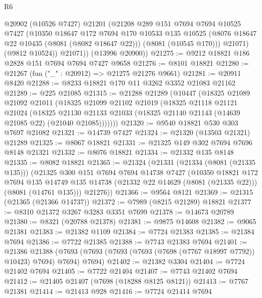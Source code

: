 \begin{lexlean}{R6}
\begin{coremodule}
            @20902
            (@10526 @7427)
            @21201
            (@21208
              @289
              @151
              @7694
              @7694
              @10525
              @7427
              (@10350
                @18647
                @172
                @7694
                @170
                @10533
                @135
                @10525
                (@8076 @18647 @22 @10435 (@8081 (@8082 @18647 @22)))
                (@8081 (@10545 @170)))
              @21071)
            (@9812 @10524))
          @21071))
      (@13996 @20900))
@21275 := @9212 @18821 @186 @2828 @151 @7694 @7694 @7427 @9658
@21276 := @8101 @18821
@21280 := @21267 (fun ("_" : @20912) => @21275 @21276 @9661)
@21281 := @20911 @8420
@21288 := @8233 @18821 @170 @11 @3262 @3352 @21083 @21162
@21289 := @225 @21085
@21315 := @21288
    @21289
    (@10447
      (@18325
        @21089
        @21092
        @21011
        (@18325
          @21099
          @21102
          @21019
          (@18325
            @21118
            @21121
            @21024
            (@18325
              @21130
              @21133
              @21033
              (@18325 @21140 @21143 (@14639 @21085 @22) (@21040 @21085)))))))
@21320 := @9540 @18821 @530 @303 @7697 @21082
@21321 := @14739 @7427
@21324 := @21320 (@13503 @21321) @21289
@21325 := @8067 @18821
@21331 := @21325 @149 @302 @7694 @7696 @8148 @21321
@21332 := @8076 @18821
@21334 := @21332 @135 @8148
@21335 := @8082 @18821
@21365 := @21324
    (@21331
      (@21334 (@8081 (@21335 @135)))
      (@21325
        @300
        @151
        @7694
        @7694
        @14738
        @7427
        (@10350
          @18821
          @172
          @7694
          @135
          @14749
          @135
          @14738
          (@21332 @22 @14629 (@8081 (@21335 @22)))
          (@8081 (@14761 @135)))
        @21276))
@21366 := @9564 @8121
@21369 := @21315 (@21365 (@21366 @14737))
@21372 := @7989 (@8215 @21289) @18821
@21377 := @8310 @21372 @3267 @3283 @3351 @7699
@21378 := @14673 @20789
@21380 := @8321 (@20788 @21378)
@21381 := @9875 @14608
@21382 := @9065 @21381
@21383 := @21382 @1109
@21384 := @7724 @21383
@21385 := @21384 @7694
@21386 := @7722 @21385
@21388 := @7743 @21383 @7694
@21401 := @21386
    @21388
    (@7693 (@7693 (@7693 (@7693 (@7698 (@7767 @18997 @7792)) @10423) @7694) @7694) @7694)
@21402 := @21382 @3304
@21404 := @7724 @21402 @7694
@21405 := @7722 @21404
@21407 := @7743 @21402 @7694
@21412 := @21405 @21407 (@7698 (@18288 @8125 @8121))
@21413 := @7767 @21381
@21414 := @21413 @928
@21416 := @7724 @21414 @7694

\end{coremodule}
\end{lexlean}
